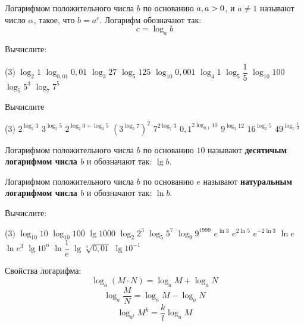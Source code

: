 %
%

\begin{class}[number=1]
	\begin{definit}
		Логарифмом положительного числа \(b\) по основанию \(a, \\ a>0 \), и \(a \neq 1\) называют число \( \alpha \), такое, что \(b=a^{c}\). Логарифм обозначают так: \[ c = \log_a b \]
	\end{definit}
	\begin{listofex}
		\item Вычислите:
		\begin{tasks}(3)
			\task \( \log_2 1 \)
			\task \( \log_{0,01} 0,01 \)
			\task \( \log_3 27 \)
			\task \( \log_5 125 \)
			\task \( \log_{10} 0,001 \)
			\task \( \log_4 1 \)
			\task \( \log_5 \dfrac{1}{5} \)
			\task \( \log_{10} 100 \)
			\task \( \log_5 5^3 \)
			\task \( \log_7 7^5 \)
		\end{tasks}
		\item Вычислите
		\begin{tasks}(3)
			\task \( 2^{\log_2 3} \)
			\task \( 3^{\log_3 5} \)
			\task \( 2^{\log_2 3 + \log_2 5} \)
			\task \( ( 3^{\log_3 7} )^2 \)
			\task \( 7^{2\log_7 3} \)
			\task \( 0,1^{2\log_{0,1} 10}  \)
			\task \( 9^{\log_3 12} \)
			\task \( 16^{\log_2 5} \)
			\task \( 49^{\log_7 \frac{1}{3}} \)
		\end{tasks}
	\end{listofex}
	\begin{definit}
		Логарифмом положительного числа \(b\) по основанию \(10\) называют \textbf{десятичым логарифмом числа \(b\)} и обозначают так: \( \lg b \).
	\end{definit}
	\begin{definit}
		Логарифмом положительного числа \(b\) по основанию \(e\) называют \textbf{натуральным логарифмом числа \(b\)} и обозначают так: \( \ln b \).
	\end{definit}
	\begin{listofex}[resume]
		\item Вычислите:
		\begin{tasks}(3)
			\task \( \log_{10} 10 \)
			\task \( \log_{10} 100 \)
			\task \( \lg 1000 \)
			\task \( \log_2 2^3 \)
			\task \( \log_5 5^7 \)
			\task \( \log_9 9^{1999} \)
			\task \( e^{\ln 3} \)
			\task \( e^{2\ln 5} \)
			\task \( e^{-2\ln 3} \)
			\task \( \ln e \)
			\task \( \ln e^3 \)
			\task \( \lg 10^n \)
			\task \( \ln \dfrac{1}{e} \)
			\task \( \lg \sqrt[3]{0,01} \)
			\task \( \lg 10^{-1} \)
		\end{tasks}
	\end{listofex}
	\begin{definit}
		Свойства логарифма:
		\[ \log_a(M \cdot N) = \log_a M + \log_a N \]
		\[ \log_a \dfrac{M}{N} = \log_a M - \log_a N \]
		\[ \log_{a^l} M^k=\dfrac{k}{l}\log_a M \]
	\end{definit}
	\begin{listofex}[resume]
		

\end{listofex}
\end{class}
